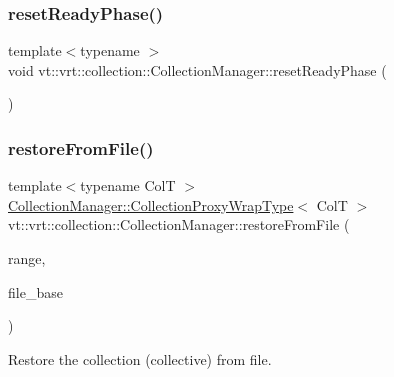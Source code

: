 \mbox{\label{structvt_1_1vrt_1_1collection_1_1_collection_manager_af93d07828954a649201ef3fe463bf530}} 
\subsubsection{\texorpdfstring{reset\+Ready\+Phase()}{resetReadyPhase()}}
{\footnotesize\ttfamily template$<$typename $>$ \\
void vt\+::vrt\+::collection\+::\+Collection\+Manager\+::reset\+Ready\+Phase (\begin{DoxyParamCaption}{ }\end{DoxyParamCaption})}

\mbox{\label{structvt_1_1vrt_1_1collection_1_1_collection_manager_a315a74b9299f31ebc5e3e4becdd9f79e}} 
\subsubsection{\texorpdfstring{restore\+From\+File()}{restoreFromFile()}}
{\footnotesize\ttfamily template$<$typename ColT $>$ \\
\hyperlink{structvt_1_1vrt_1_1collection_1_1_collection_manager_a56458ed7f9bb22b631b9b3a745f42f94}{Collection\+Manager\+::\+Collection\+Proxy\+Wrap\+Type}$<$ ColT $>$ vt\+::vrt\+::collection\+::\+Collection\+Manager\+::restore\+From\+File (\begin{DoxyParamCaption}\item[{typename Col\+T\+::\+Index\+Type}]{range,  }\item[{std\+::string const \&}]{file\+\_\+base }\end{DoxyParamCaption})}



Restore the collection (collective) from file. 


